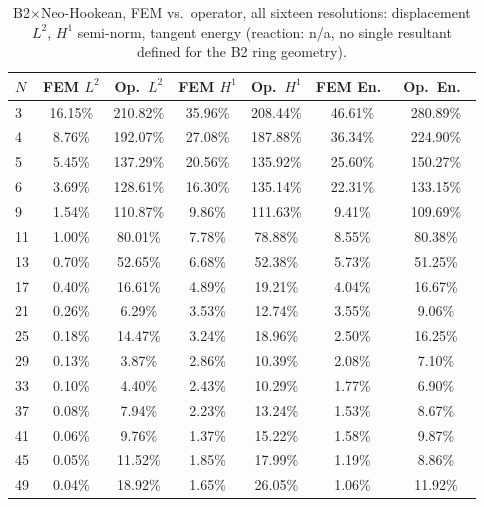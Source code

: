 \documentclass[11pt]{article}
\begin{document}
\begin{table}[h]
\centering
\caption{B2$\times$Neo-Hookean, FEM vs.\ operator, all sixteen
  resolutions: displacement $L^2$, $H^1$ semi-norm, tangent energy
  (reaction: n/a, no single resultant defined for the B2 ring
  geometry).}
\label{tab:s2-b2nh-a}
\scriptsize
\begin{tabular}{lcccccc}
\toprule
$N$ & FEM $L^2$ & Op.\ $L^2$ & FEM $H^1$ & Op.\ $H^1$ & FEM En.\ & Op.\ En.\ \\
\midrule
3  & 16.15\% & 210.82\% & 35.96\% & 208.44\% & 46.61\% & 280.89\% \\
4  & 8.76\%  & 192.07\% & 27.08\% & 187.88\% & 36.34\% & 224.90\% \\
5  & 5.45\%  & 137.29\% & 20.56\% & 135.92\% & 25.60\% & 150.27\% \\
6  & 3.69\%  & 128.61\% & 16.30\% & 135.14\% & 22.31\% & 133.15\% \\
9  & 1.54\%  & 110.87\% & 9.86\%  & 111.63\% & 9.41\%  & 109.69\% \\
11 & 1.00\%  & 80.01\%  & 7.78\%  & 78.88\%  & 8.55\%  & 80.38\%  \\
13 & 0.70\%  & 52.65\%  & 6.68\%  & 52.38\%  & 5.73\%  & 51.25\%  \\
17 & 0.40\%  & 16.61\%  & 4.89\%  & 19.21\%  & 4.04\%  & 16.67\%  \\
21 & 0.26\%  & 6.29\%   & 3.53\%  & 12.74\%  & 3.55\%  & 9.06\%   \\
25 & 0.18\%  & 14.47\%  & 3.24\%  & 18.96\%  & 2.50\%  & 16.25\%  \\
29 & 0.13\%  & 3.87\%   & 2.86\%  & 10.39\%  & 2.08\%  & 7.10\%   \\
33 & 0.10\%  & 4.40\%   & 2.43\%  & 10.29\%  & 1.77\%  & 6.90\%   \\
37 & 0.08\%  & 7.94\%   & 2.23\%  & 13.24\%  & 1.53\%  & 8.67\%   \\
41 & 0.06\%  & 9.76\%   & 1.37\%  & 15.22\%  & 1.58\%  & 9.87\%   \\
45 & 0.05\%  & 11.52\%  & 1.85\%  & 17.99\%  & 1.19\%  & 8.86\%   \\
49 & 0.04\%  & 18.92\%  & 1.65\%  & 26.05\%  & 1.06\%  & 11.92\%  \\
\bottomrule
\end{tabular}
\end{table}
\end{document}
